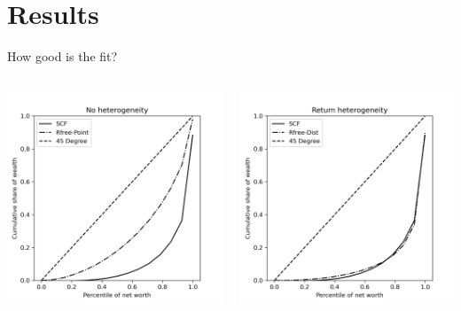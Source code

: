 \documentclass{beamer}
\begin{document}
\section{Results}

\begin{frame}{How good is the fit?}

   \begin{columns}
    \centering
    \includegraphics[width=\textwidth]{Figures/PYrrPointNetWorthPlot.png}

    \centering
    \includegraphics[width=\textwidth]{Figures/PYrrDistNetWorthPlot.png}

  \end{columns}

\end{frame}
\end{document}
